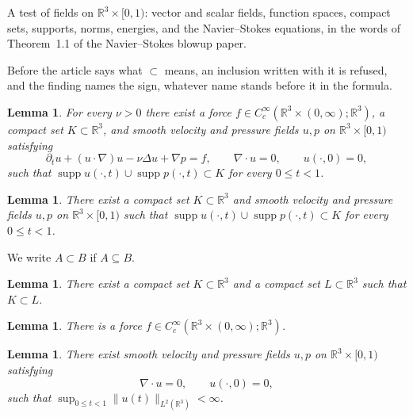 \documentclass{article}
\newtheorem{lemma}[theorem]{Lemma}
\DeclareMathOperator{\supp}{supp}
\begin{document}
A test of fields on $\mathbb R^3\times[0,1)$: vector and scalar fields, function
spaces, compact sets, supports, norms, energies, and the Navier--Stokes equations,
in the words of Theorem~1.1 of the Navier--Stokes blowup paper.

Before the article says what $\subset$ means, an inclusion written with it is refused,
and the finding names the sign, whatever name stands before it in the formula.

\begin{lemma}\label{refused}
For every $\nu>0$ there exist a force
$f\in C_c^\infty(\mathbb R^3\times(0,\infty);\mathbb R^3)$, a compact set
$K\subset\mathbb R^3$, and smooth velocity and pressure fields
$u,p$ on $\mathbb R^3\times[0,1)$ satisfying
\[
  \partial_tu+(u\cdot\nabla)u-\nu\Delta u+\nabla p=f,
  \qquad \nabla\cdot u=0,
  \qquad u(\cdot,0)=0,
\]
such that $\supp u(\cdot,t)\cup\supp p(\cdot,t)\subset K$ for every $0\leq t<1$.
\end{lemma}

\begin{lemma}\label{refused-too}
There exist a compact set $K\subset\mathbb R^3$ and smooth velocity and pressure fields
$u,p$ on $\mathbb R^3\times[0,1)$ such that
$\supp u(\cdot,t)\cup\supp p(\cdot,t)\subset K$ for every $0\leq t<1$.
\end{lemma}

We write $A\subset B$ if $A\subseteq B$.

\begin{lemma}\label{sets}
There exist a compact set $K\subset\mathbb R^3$ and a compact set $L\subset\mathbb R^3$
such that $K\subset L$.
\end{lemma}

\begin{lemma}\label{force}
There is a force $f\in C_c^\infty(\mathbb R^3\times(0,\infty);\mathbb R^3)$.
\end{lemma}

\begin{lemma}\label{fields}
There exist smooth velocity and pressure fields $u,p$ on $\mathbb R^3\times[0,1)$
satisfying
\begin{equation}
  \nabla\cdot u=0,
  \qquad u(\cdot,0)=0,
  \label{eq:div}
\end{equation}
such that $\sup_{0\leq t<1}\lVert u(t)\rVert_{L^2(\mathbb R^3)}<\infty$.
\end{lemma}
\end{document}
